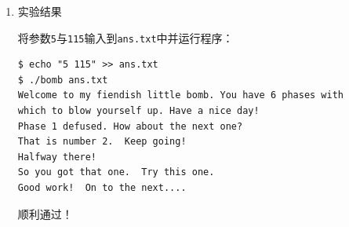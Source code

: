 \documentclass{paper}
\begin{document}
\begin{enumerate}
\begin{enumerate}
\item 确定指针转跳的路径以及第一个参数的值

查看存放在\verb|0x804a0a0|处的转跳表：
\begin{lstlisting}
(gdb) p *0x804a0a0@16
$1 = {10, 2, 14, 7, 8, 12, 15, 11, 0, 4, 1, 13, 3, 9, 6, 5}
\end{lstlisting}
循环结束后有如下代码：
\begin{lstlisting}
8048dbf: 83 fa 0f       cmp    $0xf,%edx  // edx=15才不爆炸
8048dc2: 75 06          jne    8048dca <phase_5+0x72> // explode
...
8048dca: e8 52 03 00 00 call   8049121 <explode_bomb>
\end{lstlisting}
由上述代码可知，循环结束后\verb|%edx|的值为\verb|15|才不会爆炸，而\verb|%edx|中存放的是转跳的次数，因此上述转跳需要进行\verb|15|次。又由于\verb|p1|等于15的时候才会退出循环，因此本次实验要求我们经过\verb|15|次转跳后使得\verb|p1|的值为\verb|15|。
根据\verb|p1|的最终值\verb|15|以及转跳次数，可是反向退出\verb|p1|的转跳路径：

\verb|5->12->3->7->11->13->9->4->8->0->10->1->2->14->6->15|

由此，我们得到\verb|p1|的初始值为\verb|5|，考虑到\verb|p1|在进入循环之前对\verb|16|取模，因此\verb|p1|可以是模\verb|16|后为\verb|5|的任何数。

\item 确定第二个参数的值

分析关于第二个参数的代码：
\begin{lstlisting}
8048dc4: 3b 4c 24 08     cmp   0x8(%esp),%ecx // ecx=p2才不爆炸
8048dc8: 74 05           je    8048dcf <phase_5+0x77>
8048dca: e8 52 03 00 00  call  8049121 <explode_bomb>
8048dcf: 8b 44 24 0c     mov   0xc(%esp),%eax
\end{lstlisting}
由上述代码很容易得出，第二个参数\verb|p2|的值需要与循环后的\verb|%ecx|相等，\verb|explode_bomb|函数才不会被调用。由\ref{l3}中的分析可知，\verb|%ecx|中的值为第一个参数\verb|p1|转跳路径上各个值的和（不包括初始值），即：

\verb|sum(12, 3, 7, 11, 13, 9, 4, 8, 0, 10, 1, 2, 14, 6, 15) = 115|

因此第二个参数的值为\verb|115|。

\end{enumerate}

\item 实验结果

将参数\verb|5|与\verb|115|输入到\verb|ans.txt|中并运行程序：
\begin{lstlisting}
$ echo "5 115" >> ans.txt
$ ./bomb ans.txt
Welcome to my fiendish little bomb. You have 6 phases with
which to blow yourself up. Have a nice day!
Phase 1 defused. How about the next one?
That is number 2.  Keep going!
Halfway there!
So you got that one.  Try this one.
Good work!  On to the next....
\end{lstlisting}
顺利通过！

\end{enumerate}
\end{document}
